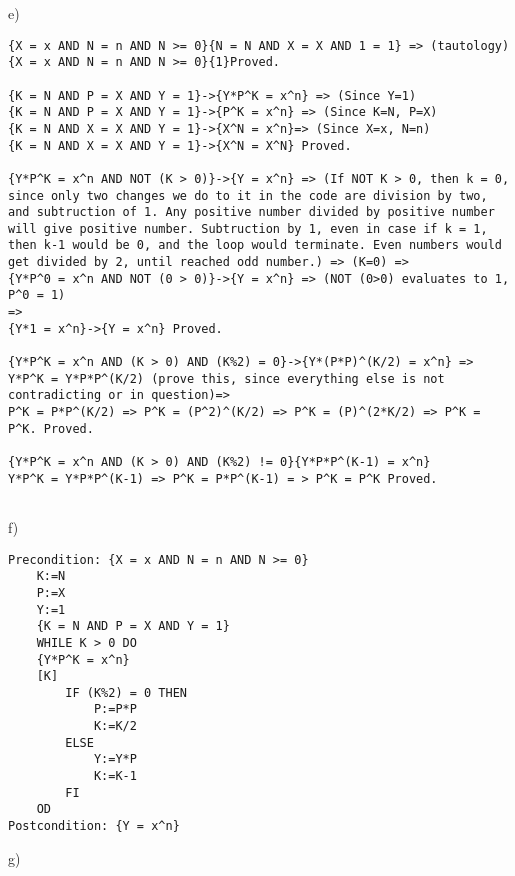 \documentclass[a4paper]{article}
\begin{document}
e)\\
\begin{lstlisting}	
{X = x AND N = n AND N >= 0}{N = N AND X = X AND 1 = 1} => (tautology)
{X = x AND N = n AND N >= 0}{1}Proved.

{K = N AND P = X AND Y = 1}->{Y*P^K = x^n} => (Since Y=1)
{K = N AND P = X AND Y = 1}->{P^K = x^n} => (Since K=N, P=X)
{K = N AND X = X AND Y = 1}->{X^N = x^n}=> (Since X=x, N=n)
{K = N AND X = X AND Y = 1}->{X^N = X^N} Proved.

{Y*P^K = x^n AND NOT (K > 0)}->{Y = x^n} => (If NOT K > 0, then k = 0, since only two changes we do to it in the code are division by two, and subtruction of 1. Any positive number divided by positive number will give positive number. Subtruction by 1, even in case if k = 1, then k-1 would be 0, and the loop would terminate. Even numbers would get divided by 2, until reached odd number.) => (K=0) =>
{Y*P^0 = x^n AND NOT (0 > 0)}->{Y = x^n} => (NOT (0>0) evaluates to 1, P^0 = 1)
=>
{Y*1 = x^n}->{Y = x^n} Proved.

{Y*P^K = x^n AND (K > 0) AND (K%2) = 0}->{Y*(P*P)^(K/2) = x^n} =>
Y*P^K = Y*P*P^(K/2) (prove this, since everything else is not contradicting or in question)=>
P^K = P*P^(K/2) => P^K = (P^2)^(K/2) => P^K = (P)^(2*K/2) => P^K = P^K. Proved.

{Y*P^K = x^n AND (K > 0) AND (K%2) != 0}{Y*P*P^(K-1) = x^n}
Y*P^K = Y*P*P^(K-1) => P^K = P*P^(K-1) = > P^K = P^K Proved.


\end{lstlisting}	
f)\\
\begin{lstlisting}	
Precondition: {X = x AND N = n AND N >= 0}	
	K:=N
	P:=X
	Y:=1
	{K = N AND P = X AND Y = 1} 
	WHILE K > 0 DO
	{Y*P^K = x^n} 
	[K]
		IF (K%2) = 0 THEN
			P:=P*P
			K:=K/2
		ELSE
			Y:=Y*P
			K:=K-1
		FI
	OD
Postcondition: {Y = x^n}
\end{lstlisting}
g)\\
\end{document}
